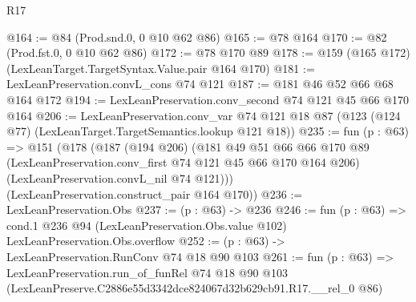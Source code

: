 \begin{lexlean}{R17}
\begin{coremodule}
@164 := @84 (Prod.snd.{0, 0} @10 @62 @86)
@165 := @78 @164
@170 := @82 (Prod.fst.{0, 0} @10 @62 @86)
@172 := @78 @170 @89
@178 := @159 (@165 @172) (LexLeanTarget.TargetSyntax.Value.pair @164 @170)
@181 := LexLeanPreservation.convL_cons @74 @121
@187 := @181 @46 @52 @66 @68 @164 @172
@194 := LexLeanPreservation.conv_second @74 @121 @45 @66 @170 @164
@206 := LexLeanPreservation.conv_var
    @74
    @121
    @18
    @87
    (@123 (@124 @77) (LexLeanTarget.TargetSemantics.lookup @121 @18))
@235 := fun (p : @63) =>
  @151
    (@178
      (@187
        (@194 @206)
        (@181
          @49
          @51
          @66
          @66
          @170
          @89
          (LexLeanPreservation.conv_first @74 @121 @45 @66 @170 @164 @206)
          (LexLeanPreservation.convL_nil @74 @121)))
      (LexLeanPreservation.construct_pair @164 @170))
@236 := LexLeanPreservation.Obs
@237 := (p : @63) -> @236
@246 := fun (p : @63) =>
  cond.{1} @236 @94 (LexLeanPreservation.Obs.value @102) LexLeanPreservation.Obs.overflow
@252 := (p : @63) -> LexLeanPreservation.RunConv @74 @18 @90 @103
@261 := fun (p : @63) =>
  LexLeanPreservation.run_of_funRel
    @74
    @18
    @90
    @103
    (LexLeanPreserve.C2886e55d3342dce824067d32b629cb91.R17.__rel_0 @86)
\end{coremodule}
\end{lexlean}
